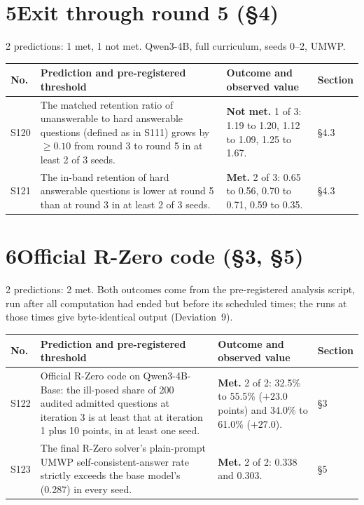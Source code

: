 \documentclass[10pt,a4paper]{article}
\newcommand{\met}{\textbf{Met.}}
\newcommand{\nmet}{\textbf{Not met.}}
\begin{document}
\section*{5\quad Exit through round 5 (\S4)}
2 predictions: 1 met, 1 not met. Qwen3-4B, full curriculum, seeds 0--2, UMWP.

\begingroup\small
\begin{longtable}{@{}L{0.9cm}L{7.8cm}L{6.1cm}L{1.3cm}@{}}
\toprule
No. & Prediction and pre-registered threshold & Outcome and observed value & Section \\
\midrule
\endfirsthead
\bottomrule
\endfoot
S120 & The matched retention ratio of unanswerable to hard answerable questions (defined as in S111) grows by $\ge 0.10$ from round 3 to round 5 in at least 2 of 3 seeds. & \nmet{} 1 of 3: 1.19 to 1.20, 1.12 to 1.09, 1.25 to 1.67. & \S4.3 \\
S121 & The in-band retention of hard answerable questions is lower at round 5 than at round 3 in at least 2 of 3 seeds. & \met{} 2 of 3: 0.65 to 0.56, 0.70 to 0.71, 0.59 to 0.35. & \S4.3 \\
\end{longtable}
\endgroup

\section*{6\quad Official R-Zero code (\S3, \S5)}
2 predictions: 2 met. Both outcomes come from the pre-registered analysis script, run after all computation had ended but before its scheduled times; the runs at those times give byte-identical output (Deviation~9).

\begingroup\small
\begin{longtable}{@{}L{0.9cm}L{7.8cm}L{6.1cm}L{1.3cm}@{}}
\toprule
No. & Prediction and pre-registered threshold & Outcome and observed value & Section \\
\midrule
\endfirsthead
\bottomrule
\endfoot
S122 & Official R-Zero code on Qwen3-4B-Base: the ill-posed share of 200 audited admitted questions at iteration 3 is at least that at iteration 1 plus 10 points, in at least one seed. & \met{} 2 of 2: 32.5\% to 55.5\% ($+23.0$ points) and 34.0\% to 61.0\% ($+27.0$). & \S3 \\
S123 & The final R-Zero solver's plain-prompt UMWP self-consistent-answer rate strictly exceeds the base model's (0.287) in every seed. & \met{} 2 of 2: 0.338 and 0.303. & \S5 \\
\end{longtable}
\endgroup
\end{document}
